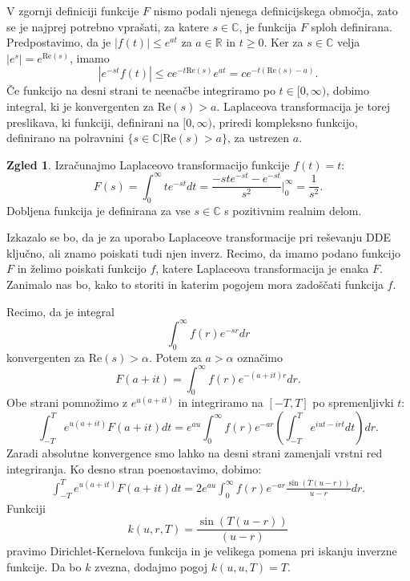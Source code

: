 \documentclass[12pt,a4paper]{amsart}
\theoremstyle{definition} %
\newtheorem{zgled}[definicija]{Zgled}
\theoremstyle{plain} %
\newcommand{\R}{\mathbb R}
\newcommand{\C}{\mathbb C}
\begin{document}
\noindent V zgornji definiciji funkcije $F$ nismo podali njenega definicijskega območja, zato se je
najprej potrebno vprašati, za katere $s\in\C$, je funkcija $F$ sploh definirana. Predpostavimo, da je
$|f(t)|\leq e^{at}$ za $a\in\R$ in $t\geq0$. Ker za $s\in\C$ velja $|e^{s}|=e^{\text{Re}(s)}$, imamo
\[|e^{-st}f(t)| \leq ce^{-t\text{Re}(s)}e^{at}=ce^{-t(\text{Re}(s)-a)}.\]
Če funkcijo na desni strani te neenačbe integriramo po $t\in [0,\infty)$, dobimo integral, ki je konvergenten za $\text{Re}(s)>a$.
Laplaceova transformacija je torej preslikava, ki funkciji, definirani na $[0,\infty)$, priredi
kompleksno funkcijo, definirano na polravnini $\{s\in\C | \text{Re}(s)>a\}$, za ustrezen $a$.

\begin{zgled}
    Izračunajmo Laplaceovo transformacijo funkcije $f(t)=t$:
    \[F(s)=\int_0^{\infty}te^{-st}dt = \frac{-ste^{-st}-e^{-st}}{s^2}\Bigr|_{0}^{\infty}=\frac{1}{s^2}.\]
    Dobljena funkcija je definirana za vse $s\in\C$ s pozitivnim realnim delom.
\end{zgled}


Izkazalo se bo, da je za uporabo Laplaceove transformacije pri reševanju DDE ključno, 
ali znamo poiskati tudi njen inverz.
Recimo, da imamo podano funkcijo
$F$ in želimo poiskati funkcijo $f$, katere Laplaceova transformacija je enaka $F$.
Zanimalo nas bo, kako to storiti in katerim pogojem mora zadoščati funkcija $f$.

Recimo, da je integral 
\[\int_0^{\infty}f(r)e^{-sr}dr\]
konvergenten za $\text{Re}(s)>\alpha$. Potem za $a>\alpha$ označimo
\[F(a+it)=\int_0^{\infty}f(r)e^{-(a+it)r}dr.\]
Obe strani pomnožimo z $e^{u(a+it)}$ in integriramo na $[-T,T]$ po spremenljivki $t$:
\[\int_{-T}^{T}e^{u(a+it)}F(a+it)dt=e^{au}\int_0^{\infty}f(r)e^{-ar}\left(\int_{-T}^{T}e^{iut-irt}dt\right)dr.\]
Zaradi absolutne konvergence smo lahko na desni strani zamenjali vrstni red integriranja.
Ko desno stran poenostavimo, dobimo:
\begin{equation} \label{eq2}
    \begin{split}
        \int_{-T}^{T}e^{u(a+it)}F(a+it)dt=2e^{au}\int_0^{\infty}f(r)e^{-ar}\frac{\sin(T(u-r))}{u-r}dr.
    \end{split}
\end{equation}
Funkciji $$k(u,r,T)=\frac{\sin(T(u-r))}{(u-r)}$$ pravimo Dirichlet-Kernelova funkcija in je velikega pomena 
pri iskanju inverzne funkcije. Da bo $k$ zvezna, dodajmo pogoj $k(u,u,T)=T$. %
\end{document}
